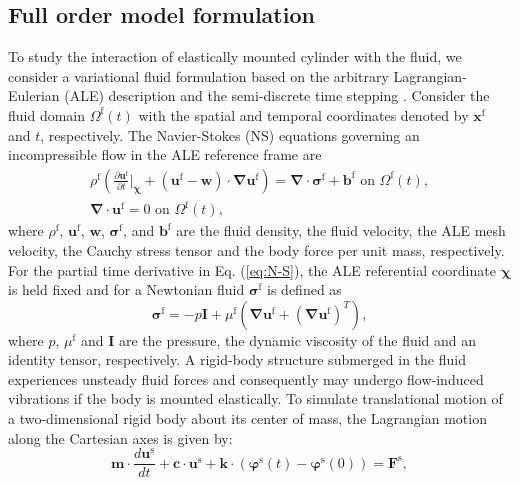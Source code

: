 \documentclass{jfm}
\newcommand{\bu}{\mathbf{u}}
\newcommand{\bw}{\mathbf{w}}
\def\Otf{\Omega^\mathrm{f}(t)}
\newcommand{\xx}{\mbox{$\mathbf{x}^{\mathrm{f}}$}}
\newcommand{\bchi}{\mathbf{\chi}}
\begin{document}
\subsection{Full order model formulation}
To study the interaction of elastically mounted cylinder with the fluid, 
we consider a variational fluid formulation based on 
the arbitrary Lagrangian-Eulerian (ALE) description 
and the semi-discrete time stepping \citep{Jaiman2015,Liu2014}. 
%
Consider the fluid domain $\Otf$ with the spatial and temporal coordinates 
denoted by $\xx$ and $t$, respectively.
%
The Navier-Stokes (NS) equations governing an incompressible flow  
in the ALE reference frame are
%
\begin{align}
\rho^\mathrm{f} \left( \frac{\partial \bu^\mathrm{f}}{\partial t} \bigg\rvert_{\bchi} + \left(\bu^\mathrm{f}-\bw\right)\cdot \boldsymbol{\nabla} \bu^
\mathrm{f} \right )= \boldsymbol{\nabla} \cdot \boldsymbol{\sigma}^\mathrm{f} + \mathbf{b}^\mathrm{f} \mbox{ on } \Otf \label{eq:N-S}, \\
\boldsymbol{\nabla} \cdot\bu^\mathrm{f} = 0 \mbox{ on } \Otf \label{eq:continuity},
\end{align}
where $\rho^\mathrm{f}$, $\bu^\mathrm{f}$, 
$\bw$, $\boldsymbol{\sigma}^\mathrm{f}$, and $\mathbf{b}^\mathrm{f}$ 
are the fluid density, the fluid velocity, the ALE mesh velocity, the 
Cauchy stress tensor and the body force per unit mass, respectively. 
%
For the partial time derivative in Eq. (\ref{eq:N-S}), 
the ALE referential coordinate $\bchi$ is held fixed and for a Newtonian fluid
$\boldsymbol{\sigma}^\mathrm{f}$ is defined as
\begin{equation}
\boldsymbol{\sigma}^\mathrm{f} = -p\mathbf{I} + \mu^\mathrm{f}\left(\boldsymbol{\nabla} \bu^\mathrm{f} + \left(\boldsymbol{\nabla} \bu^\mathrm{f}\right)^T
\right),
\label{eq:cauchyStress}
\end{equation}
%
where $p$, $\mu^\mathrm{f}$ and $ \mathbf{I} $ are the  pressure, the dynamic viscosity of the fluid and an identity tensor, respectively.
A rigid-body structure submerged in the fluid experiences unsteady fluid forces
and consequently may undergo flow-induced vibrations if the body is mounted elastically. 
To simulate translational motion of a two-dimensional rigid body about its center of mass, the Lagrangian motion along the Cartesian axes is given by:
\begin{equation}
\mathbf{m} \cdot\frac{d {\bu}^\mathrm{s}}{d t}+ \mathbf{c} \cdot{\bu}^\mathrm{s}+\mathbf{k} \cdot\left(\boldsymbol{\varphi}^\mathrm{s}
\left(t\right)-\boldsymbol{\varphi}^\mathrm{s}
\left(0\right)\right)=\mathbf{F}^\mathrm{s},
\label{eq:rigid}
\end{equation}
\end{document}
